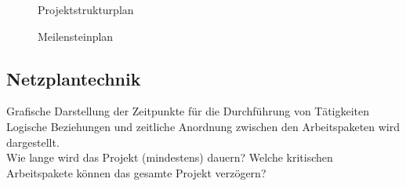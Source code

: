 \begin{figure}[ht]
	\centering
	\caption[]{Projektstrukturplan}
\end{figure}

\begin{figure}[ht]
	\centering
	\caption[]{Meilensteinplan}
\end{figure}

\subsection{Netzplantechnik}
 Grafische Darstellung der Zeitpunkte für die Durchführung von Tätigkeiten \\
 Logische Beziehungen und zeitliche Anordnung zwischen den Arbeitspaketen wird dargestellt. \\
Wie lange wird das Projekt (mindestens) dauern?
Welche kritischen Arbeitspakete können das gesamte Projekt verzögern?


